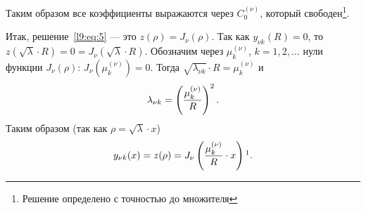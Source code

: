 \noindent Таким образом все коэффициенты выражаются через $C_0^{(\nu)}$, который свободен\footnote{Решение определено с точностью до множителя}.

Итак, решение~\eqref{l9:eq:5} --- это $z(\rho)=J_{\nu}(\rho)$. Так как $y_{\nu k}(R)=0$, то $z(\sqrt{\lambda}\cdot R)=0=J_{\nu}\left(\sqrt{\lambda}\cdot R\right)$. Обозначим через $\mu_k^{(\nu)}$, $k=1,2,\ldots$ нули функции $J_{\nu}(\rho):\,J_{\nu}\left(\mu_k^{(\nu)}\right)=0$. Тогда $\sqrt{\lambda_{\nu k}}\cdot R=\mu_{k}^{(\nu)}$ и 
\begin{equation}\label{l9:eq:7}
	\hfill\lambda_{\nu k}=\left(\frac{\mu_{k}^{(\nu)}}{R}\right)^2.\hfill
\end{equation}
Таким образом (так как $\rho=\sqrt{\lambda}\cdot x$)
\begin{equation}\label{l9:eq:8}
	\hfill y_{\nu k}(x)=z(\rho)=J_{\nu}\left(\frac{\mu_{k}^{(\nu)}}{R}\cdot x\right)\footnotemark{}.\hfill
\end{equation}

